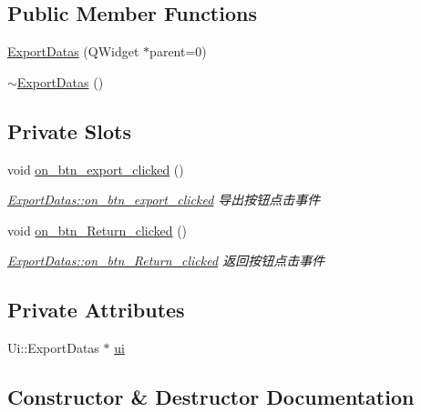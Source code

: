 \subsection*{Public Member Functions}
\begin{DoxyCompactItemize}
\item 
\mbox{\hyperlink{class_export_datas_ac10b5c403c931f0c3e78affc26176f41}{Export\+Datas}} (Q\+Widget $\ast$parent=0)
\item 
\mbox{\hyperlink{class_export_datas_ae221d807f785991c912976696581979f}{$\sim$\+Export\+Datas}} ()
\end{DoxyCompactItemize}
\subsection*{Private Slots}
\begin{DoxyCompactItemize}
\item 
void \mbox{\hyperlink{class_export_datas_a937c315ff3df44fa7693741cc9f046a4}{on\+\_\+btn\+\_\+export\+\_\+clicked}} ()
\begin{DoxyCompactList}\small\item\em \mbox{\hyperlink{class_export_datas_a937c315ff3df44fa7693741cc9f046a4}{Export\+Datas\+::on\+\_\+btn\+\_\+export\+\_\+clicked}} 导出按钮点击事件 \end{DoxyCompactList}\item 
void \mbox{\hyperlink{class_export_datas_aabc1ba322fdca1fd2eb40e123eb68f92}{on\+\_\+btn\+\_\+\+Return\+\_\+clicked}} ()
\begin{DoxyCompactList}\small\item\em \mbox{\hyperlink{class_export_datas_aabc1ba322fdca1fd2eb40e123eb68f92}{Export\+Datas\+::on\+\_\+btn\+\_\+\+Return\+\_\+clicked}} 返回按钮点击事件 \end{DoxyCompactList}\end{DoxyCompactItemize}
\subsection*{Private Attributes}
\begin{DoxyCompactItemize}
\item 
Ui\+::\+Export\+Datas $\ast$ \mbox{\hyperlink{class_export_datas_afc65ebd628b8160037d1025c03f261ef}{ui}}
\end{DoxyCompactItemize}


\subsection{Constructor \& Destructor Documentation}
\mbox{\label{class_export_datas_ac10b5c403c931f0c3e78affc26176f41}} 
